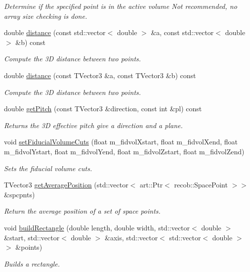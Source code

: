 \begin{DoxyCompactItemize}
\begin{DoxyCompactList}\small\item\em Determine if the specified point is in the active volume Not recommended, no array size checking is done. \end{DoxyCompactList}\item 
double \hyperlink{classlee_1_1GeometryHelper_a15984c2f8c26a4bb9578835bedd19537}{distance} (const std\-::vector$<$ double $>$ \&a, const std\-::vector$<$ double $>$ \&b) const 
\begin{DoxyCompactList}\small\item\em Compute the 3\-D distance between two points. \end{DoxyCompactList}\item 
double \hyperlink{classlee_1_1GeometryHelper_a481ad8eed3b9842a114cce96c73fb02e}{distance} (const T\-Vector3 \&a, const T\-Vector3 \&b) const 
\begin{DoxyCompactList}\small\item\em Compute the 3\-D distance between two points. \end{DoxyCompactList}\item 
double \hyperlink{classlee_1_1GeometryHelper_a02f688ef51442c37a5440d45cfad799f}{get\-Pitch} (const T\-Vector3 \&direction, const int \&pl) const 
\begin{DoxyCompactList}\small\item\em Returns the 3\-D effective pitch give a direction and a plane. \end{DoxyCompactList}\item 
void \hyperlink{classlee_1_1GeometryHelper_a5b67d6d907f9fca0e16ccd9dba85eb54}{set\-Fiducial\-Volume\-Cuts} (float m\-\_\-fidvol\-Xstart, float m\-\_\-fidvol\-Xend, float m\-\_\-fidvol\-Ystart, float m\-\_\-fidvol\-Yend, float m\-\_\-fidvol\-Zstart, float m\-\_\-fidvol\-Zend)
\begin{DoxyCompactList}\small\item\em Sets the fiducial volume cuts. \end{DoxyCompactList}\item 
T\-Vector3 \hyperlink{classlee_1_1GeometryHelper_a1a7546e5a4c1693a9366126ac6c63ba9}{get\-Average\-Position} (std\-::vector$<$ art\-::\-Ptr$<$ recob\-::\-Space\-Point $>$$>$ \&spcpnts)
\begin{DoxyCompactList}\small\item\em Return the average position of a set of space points. \end{DoxyCompactList}\item 
void \hyperlink{classlee_1_1GeometryHelper_a403b726646563c7fa8bce4c316226e15}{build\-Rectangle} (double length, double width, std\-::vector$<$ double $>$ \&start, std\-::vector$<$ double $>$ \&axis, std\-::vector$<$ std\-::vector$<$ double $>$$>$ \&points)
\begin{DoxyCompactList}\small\item\em Builds a rectangle. \end{DoxyCompactList}\end{DoxyCompactItemize}


